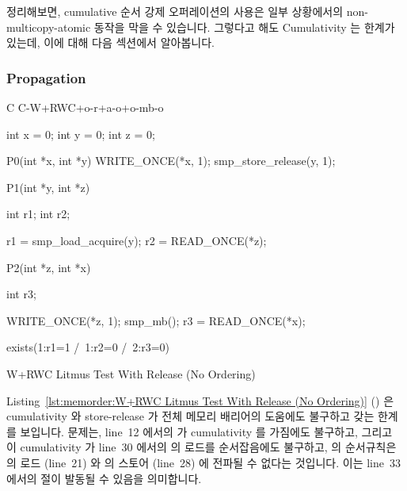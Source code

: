 정리해보면, cumulative 순서 강제 오퍼레이션의 사용은 일부 상황에서의
non-multicopy-atomic 동작을 막을 수 있습니다.
그렇다고 해도 Cumulativity 는 한계가 있는데, 이에 대해 다음 섹션에서
알아봅니다.

\subsubsection{Propagation}
\label{sec:memorder:Propagation}

\begin{listing}[tbp]
{ \scriptsize
\begin{verbbox}[\LstLineNo]
C C-W+RWC+o-r+a-o+o-mb-o

{
int x = 0;
int y = 0;
int z = 0;
}

P0(int *x, int *y)
{
  WRITE_ONCE(*x, 1);
  smp_store_release(y, 1);
}

P1(int *y, int *z)
{
  int r1;
  int r2;

  r1 = smp_load_acquire(y);
  r2 = READ_ONCE(*z);
}

P2(int *z, int *x)
{
  int r3;

  WRITE_ONCE(*z, 1);
  smp_mb();
  r3 = READ_ONCE(*x);
}

exists(1:r1=1 /\ 1:r2=0 /\ 2:r3=0)
\end{verbbox}
}
\centering
\theverbbox
\caption{W+RWC Litmus Test With Release (No Ordering)}
\label{lst:memorder:W+RWC Litmus Test With Release (No Ordering)}
\end{listing}

Listing~\ref{lst:memorder:W+RWC Litmus Test With Release (No Ordering)}
()
은 cumulativity 와 store-release 가 전체 메모리 배리어의 도움에도 불구하고 갖는
한계를 보입니다.
문제는, line~12 에서의  가 cumulativity 를 가짐에도
불구하고, 그리고 이 cumulativity 가 line~30 에서의  의 로드를
순서잡음에도 불구하고,  의 순서규칙은  의 로드
(line~21) 와  의 스토어 (line~28) 에 전파될 수 없다는 것입니다.
이는 line~33 에서의  절이 발동될 수 있음을 의미합니다.
\iffalse

